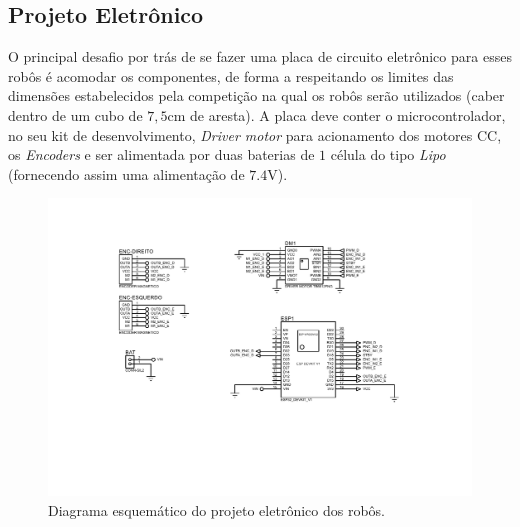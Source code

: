 \subsection{Projeto Eletrônico}
\label{subsec:pro_eletronico}


O principal desafio por trás de se fazer uma placa de circuito eletrônico para esses robôs é acomodar os componentes, de forma a respeitando os limites das dimensões estabelecidos pela competição na qual os robôs serão utilizados (caber dentro de um cubo de $7,5$cm de aresta). A placa deve conter o microcontrolador, no seu kit de desenvolvimento, \textit{Driver motor} para acionamento dos motores CC, os \textit{Encoders} e ser alimentada por duas baterias de $1$ célula do tipo \textit{Lipo} (fornecendo assim uma alimentação de $7.4$V).\\


\begin{figure}[H]
    \centering
    \includegraphics[width=\textwidth]{figuras/eletronica/placa/esquematico_completo.pdf}
    \caption{Diagrama esquemático do projeto eletrônico dos robôs.}
    \label{fig:diagrama_esquematico}
\end{figure}

